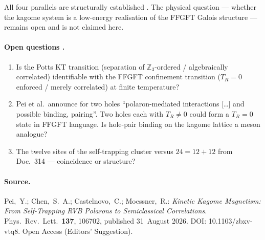 All four parallels are structurally established \SM. The physical question
--- whether the kagome system is a low-energy realisation of the FFGFT Galois
structure --- remains open and is not claimed here.

\paragraph{Open questions \SM.}
\begin{enumerate}
  \item Is the Potts KT transition (separation of $\mathbb{Z}_3$-ordered /
        algebraically correlated) identifiable with the FFGFT confinement
        transition ($T_R=0$ enforced / merely correlated) at finite
        temperature?
  \item Pei et al.\ announce for two holes ``polaron-mediated interactions
        [\ldots] and possible binding, pairing''. Two holes each with
        $T_R\neq0$ could form a $T_R=0$ state in FFGFT language. Is hole-pair
        binding on the kagome lattice a meson analogue?
  \item The twelve sites of the self-trapping cluster versus $24=12+12$
        from Doc.~314 --- coincidence or structure?
\end{enumerate}

\paragraph{Source.} Pei,~Y.; Chen,~S.~A.; Castelnovo,~C.; Moessner,~R.:
\textit{Kinetic Kagome Magnetism: From Self-Trapping RVB Polarons to
Semiclassical Correlations.}
Phys.~Rev.~Lett.~\textbf{137}, 106702, published 31~August 2026.
DOI: 10.1103/zbxv-vtq8. Open Access (Editors' Suggestion).
